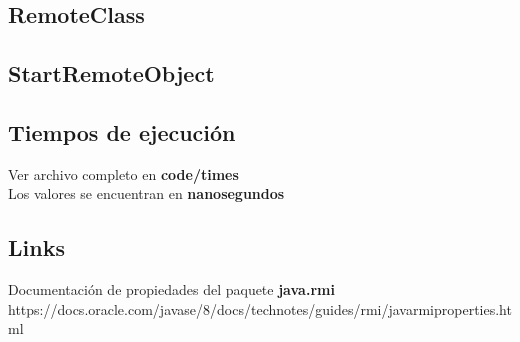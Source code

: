 \documentclass[12pt,journal,compsoc]{IEEEtran}
\begin{document}
\subsection{RemoteClass}
\label{section:RemoteClass}


\subsection{StartRemoteObject}
\label{section:StartRemoteObject}


\subsection{Tiempos de ejecución}
Ver archivo completo en \textbf{code/times}\\
Los valores se encuentran en \textbf{nanosegundos}
\label{section:times}


\subsection{Links}
\label{section:links}
Documentación de propiedades del paquete \textbf{java.rmi}\\
https://docs.oracle.com/javase/8/docs/technotes/guides/rmi/javarmiproperties.html

\ifCLASSOPTIONcaptionsoff
  \newpage
\fi
\end{document}
